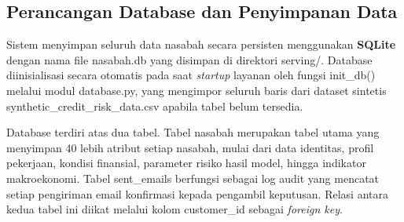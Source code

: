 

\subsection{Perancangan Database dan Penyimpanan Data}

Sistem menyimpan seluruh data nasabah secara persisten menggunakan \textbf{SQLite} dengan nama file nasabah.db yang disimpan di direktori serving/. Database diinisialisasi secara otomatis pada saat \textit{startup} layanan oleh fungsi init\_db() melalui modul database.py, yang mengimpor seluruh baris dari dataset sintetis synthetic\_credit\_risk\_data.csv apabila tabel belum tersedia.

Database terdiri atas dua tabel. Tabel nasabah merupakan tabel utama yang menyimpan 40 lebih atribut setiap nasabah, mulai dari data identitas, profil pekerjaan, kondisi finansial, parameter risiko hasil model, hingga indikator makroekonomi. Tabel sent\_emails berfungsi sebagai log audit yang mencatat setiap pengiriman email konfirmasi kepada pengambil keputusan. Relasi antara kedua tabel ini diikat melalui kolom customer\_id sebagai \textit{foreign key}.

